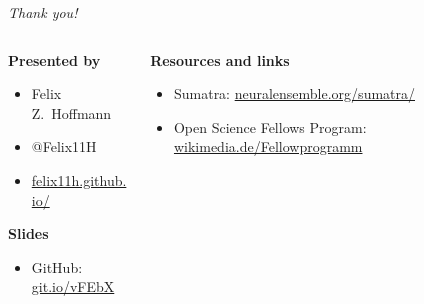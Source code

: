 \begin{frame}
  \begin{center} 
    \LARGE \textit{Thank you!}
  \end{center}
  
  \vspace{0.19cm}

  \small
  \begin{columns}[t]
    \begin{column}{0.4\textwidth}        
      \textbf{Presented by}
      
      \begin{itemize}[leftmargin=0.6cm]
        \itemsep0pt
      \item[] Felix Z.~Hoffmann
        \item[] @Felix11H
        \item[] \href{http://felix11h.github.io/}{felix11h.github.io/}
      \end{itemize}

      \vspace{0.38cm}
      \textbf{Slides}
      
      \begin{itemize}[leftmargin=0.6cm]
        \item[] GitHub:\\ %
          \href{https://github.com/Felix11H/GSoC14_munich_slides}{git.io/vFEbX}
      \end{itemize}
    \end{column}
    \begin{column}{0.59\textwidth}
      \textbf{Resources and links}
      \vspace{-0.1cm}
       
      \begin{itemize}[leftmargin=0.6cm]
        \itemsep4pt
        \item[] Sumatra: %
          \href{http://neuralensemble.org/sumatra/}{%
            neuralensemble.org/sumatra/}\\
        \item[] Open Science Fellows Program: %
          \href{https://wikimedia.de/wiki/BildungWissenschaftKultur/Fellowprogramm}{%
            wikimedia.de/Fellowprogramm}
      \end{itemize}


\end{column}
\end{columns}
\end{frame}
